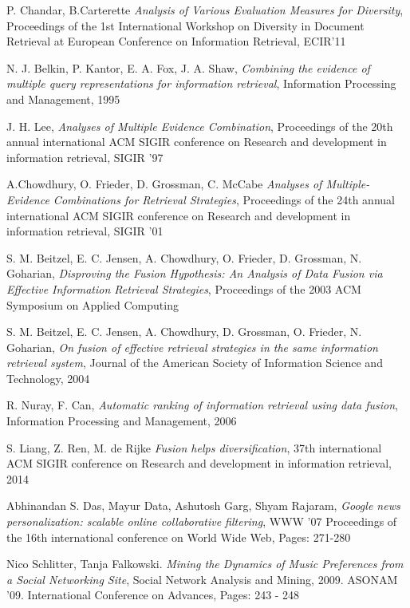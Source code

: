 \begin{thebibliography}{99}
		P. Chandar, B.Carterette
		\emph{Analysis of Various Evaluation Measures for Diversity},
		Proceedings of the 1st International Workshop on Diversity in Document Retrieval at European Conference on Information Retrieval,
		ECIR’11

		N. J. Belkin, P. Kantor, E. A. Fox, J. A. Shaw,
		\emph{Combining the evidence of multiple query representations for information retrieval},
		Information Processing and Management, 1995

		J. H. Lee,
		\emph{Analyses of Multiple Evidence Combination},
		Proceedings of the 20th annual international ACM SIGIR conference on Research and development in information retrieval,
		SIGIR '97

		A.Chowdhury, O. Frieder, D. Grossman, C. McCabe
		\emph{Analyses of Multiple-Evidence Combinations for Retrieval Strategies},
		Proceedings of the 24th annual international ACM SIGIR conference on Research and development in information retrieval, SIGIR '01

		S. M. Beitzel, E. C. Jensen, A. Chowdhury, O. Frieder, D. Grossman, N. Goharian,
		\emph{Disproving the Fusion Hypothesis: An Analysis of Data Fusion via Effective Information Retrieval Strategies},
		Proceedings of the 2003 ACM Symposium on Applied Computing

		S. M. Beitzel, E. C. Jensen, A. Chowdhury, D. Grossman, O. Frieder, N. Goharian,
		\emph{On fusion of effective retrieval strategies in the same information retrieval system},
		Journal of the American Society of Information Science and Technology,
		2004

		R. Nuray, F. Can,
		\emph{Automatic ranking of information retrieval using data fusion},
		Information Processing and Management, 2006

		S. Liang, Z. Ren, M. de Rijke
		\emph{Fusion helps diversification},
		37th international ACM SIGIR conference on Research and development in information retrieval,
		2014

		Abhinandan S. Das, Mayur Data, Ashutosh Garg, Shyam Rajaram,
		\emph{Google news personalization: scalable online collaborative filtering},
		WWW '07 Proceedings of the 16th international conference on World Wide Web,
		Pages: 271-280

		Nico Schlitter, Tanja Falkowski.
		\emph{Mining the Dynamics of Music Preferences from a Social Networking Site},
		Social Network Analysis and Mining, 2009. ASONAM '09. International Conference on Advances,
		Pages: 243 - 248


\end{thebibliography}
